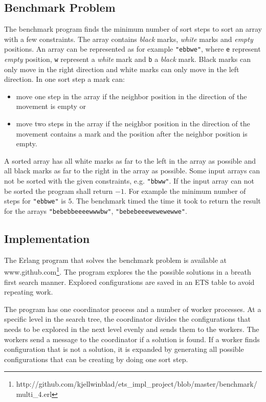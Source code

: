 \documentclass[aps,pre,preprint,nofootinbib]{revtex4}
\begin{document}
  \subsection{Benchmark Problem}
    The benchmark program finds the minimum number of sort steps to sort an array with a few constraints.
    The array contains \emph{black} marks, \emph{white} marks and \emph{empty} positions.
    An array can be represented as for example \verb|"ebbwe"|, where \verb|e| represent \emph{empty} position, \verb|w| represent a \emph{white} mark and \verb|b| a \emph{black} mark.
    Black marks can only move in the right direction and white marks can only move in the left direction.
    In one sort step a mark can:
    \begin{itemize}
     \item move one step in the array if the neighbor position in the direction of the movement is empty or
     \item move two steps in the array if the neighbor position in the direction of the movement contains a mark and the position after the neighbor position is empty.
    \end{itemize}
    A sorted array has all white marks as far to the left in the array as possible and all black marks as far to the right in the array as possible.
    Some input arrays can not be sorted with the given constraints, e.g. \verb|"bbww"|.
    If the input array can not be sorted the program shall return $-1$.
    For example the minimum number of steps for \verb|"ebbwe"| is $5$.
    The benchmark timed the time it took to return the result for the arrays \verb|"bebebbeeeewwwbw"|, \verb|"bebebeeewewewewwe"|.
    
  \subsection{Implementation}
    The Erlang program that solves the benchmark problem is available at www.github.com\footnote{http://github.com/kjellwinblad/ets\_impl\_project/blob/master/benchmark/multi\_4.erl}.
    The program explores the the possible solutions in a breath first search manner.
    Explored configurations are saved in an ETS table to avoid repeating work.
    
    The program has one coordinator process and a number of worker processes.
    At a specific level in the search tree, the coordinator divides the configurations that needs to be explored in the next level evenly and sends them to the workers.
    The workers send a message to the coordinator if a solution is found.
    If a worker finds configuration that is not a solution, it is expanded by generating all possible configurations that can be creating by doing one sort step.
    
\end{document}
